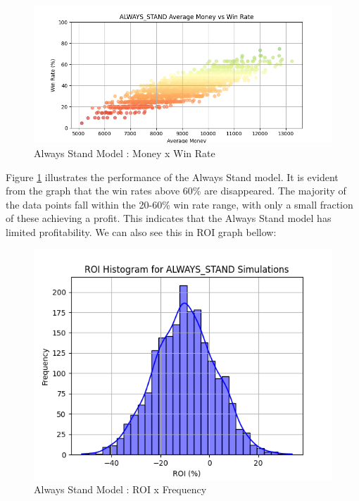 \documentclass[a4paper,12pt]{report}
\begin{document}
\baselineskip

\begin{figure}[h]
\begin{center}
\includegraphics[scale=0.6]{figures/graphs/as_money_wr_big.png}
\end{center}
\caption{Always Stand Model : Money x Win Rate}
\label{fig:as_money_wr}
\end{figure}

Figure \ref{fig:as_money_wr} illustrates the performance of the Always Stand model. It is evident from the graph that the win rates above 60\% are disappeared. The majority of the data points fall within the 20-60\% win rate range, with only a small fraction of these achieving a profit. This indicates that the Always Stand model has limited profitability. We can also see this in ROI graph bellow:

\begin{figure}[h]
\begin{center}
\includegraphics[scale=0.6]{figures/graphs/as_roi.png}
\end{center}
\caption{Always Stand Model : ROI x Frequency}
\label{fig:as_roi}
\end{figure}
\end{document}
